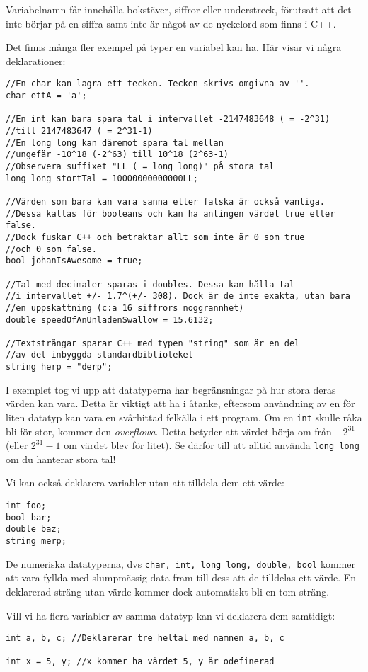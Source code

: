 Variabelnamn får innehålla bokstäver, siffror eller understreck, förutsatt att det inte börjar på en siffra samt inte är något av de nyckelord som finns i C++.

Det finns många fler exempel på typer en variabel kan ha. Här visar vi några deklarationer:

\begin{lstlisting}
//En char kan lagra ett tecken. Tecken skrivs omgivna av ''.
char ettA = 'a';

//En int kan bara spara tal i intervallet -2147483648 ( = -2^31)
//till 2147483647 ( = 2^31-1)
//En long long kan däremot spara tal mellan 
//ungefär -10^18 (-2^63) till 10^18 (2^63-1)
//Observera suffixet "LL ( = long long)" på stora tal
long long stortTal = 10000000000000LL;

//Värden som bara kan vara sanna eller falska är också vanliga.
//Dessa kallas för booleans och kan ha antingen värdet true eller false.
//Dock fuskar C++ och betraktar allt som inte är 0 som true
//och 0 som false.
bool johanIsAwesome = true;

//Tal med decimaler sparas i doubles. Dessa kan hålla tal
//i intervallet +/- 1.7^(+/- 308). Dock är de inte exakta, utan bara
//en uppskattning (c:a 16 siffrors noggrannhet)
double speedOfAnUnladenSwallow = 15.6132;

//Textsträngar sparar C++ med typen "string" som är en del
//av det inbyggda standardbiblioteket
string herp = "derp";
\end{lstlisting}


I exemplet tog vi upp att datatyperna har begränsningar på hur stora deras värden kan vara. Detta är viktigt att ha i åtanke, eftersom användning av en för liten datatyp kan vara en svårhittad felkälla i ett program. Om en \texttt{int} skulle råka bli för stor, kommer den \emph{overflowa}. Detta betyder att värdet börja om från $-2^{31}$ (eller $2^{31}-1$ om värdet blev för litet). Se därför till att alltid använda \texttt{long long} om du hanterar stora tal!

Vi kan också deklarera variabler utan att tilldela dem ett värde: 

\begin{lstlisting}
int foo;
bool bar;
double baz;
string merp;
\end{lstlisting}

De numeriska datatyperna, dvs \texttt{char, int, long long, double, bool} kommer att vara fyllda med slumpmässig data fram till dess att de tilldelas ett värde. En deklarerad sträng utan värde kommer dock automatiskt bli en tom sträng.

Vill vi ha flera variabler av samma datatyp kan vi deklarera dem samtidigt:

\begin{lstlisting}
int a, b, c; //Deklarerar tre heltal med namnen a, b, c

int x = 5, y; //x kommer ha värdet 5, y är odefinerad
\end{lstlisting}
